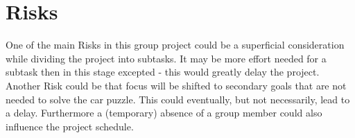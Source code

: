 \documentclass[a4paper, 12pt]{scrartcl}%
\begin{document}
\section{Risks}
One of the main Risks in this group project could be a superficial consideration while dividing the project into subtasks. It may be more effort needed for a subtask then in this stage excepted - this would greatly delay the project. Another Risk could be that focus will be shifted to secondary goals that are not needed to solve the car puzzle. This could eventually, but not necessarily, lead to a delay. Furthermore a (temporary) absence of a group member could also influence the project schedule.
\end{document}
